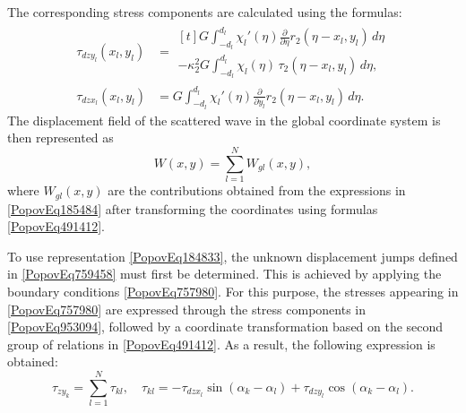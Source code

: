 The corresponding stress components are calculated using the formulas:
\begin{equation} \label{PopovEq953094} 
	\begin{aligned} 
		\tau_{d z y_l}(x_l, y_l) &=
		\begin{multlined}[t]
			G \int_{-d_l}^{d_l} \chi_l'(\eta) \frac{\partial}{\partial \eta} r_2(\eta - x_l, y_l)\, d\eta 
			\\
			- \kappa_2^2 G \int_{-d_l}^{d_l} \chi_l(\eta)\, \tau_2(\eta - x_l, y_l)\, d\eta,
		\end{multlined}
		\\
		\tau_{d z x_l}(x_l, y_l) &= 
		G \int_{-d_l}^{d_l} \chi_l'(\eta) \frac{\partial}{\partial y_l} r_2(\eta - x_l, y_l)\, d\eta.
	\end{aligned} 
\end{equation}
The displacement field of the scattered wave in the global coordinate system is then represented as
\begin{equation} \label{PopovEq184833} 
	W(x, y) = \sum_{l = 1}^{N} W_{gl}(x, y),
\end{equation}
where \( W_{gl}(x, y) \) are the contributions obtained from the expressions in \eqref{PopovEq185484} after transforming the coordinates using formulas \eqref{PopovEq491412}.

To use representation \eqref{PopovEq184833}, the unknown displacement jumps defined in \eqref{PopovEq759458} must first be determined. This is achieved by applying the boundary conditions \eqref{PopovEq757980}. For this purpose, the stresses appearing in \eqref{PopovEq757980} are expressed through the stress components in \eqref{PopovEq953094}, followed by a coordinate transformation based on the second group of relations in \eqref{PopovEq491412}. As a result, the following expression is obtained:
\begin{equation} \label{PopovEq529534} 
	\tau_{z y_k} = \sum_{l = 1}^{N} \tau_{kl}, \quad 
	\tau_{kl} = -\tau_{d z x_l} \sin(\alpha_k - \alpha_l) + \tau_{d z y_l} \cos(\alpha_k - \alpha_l).
\end{equation}

